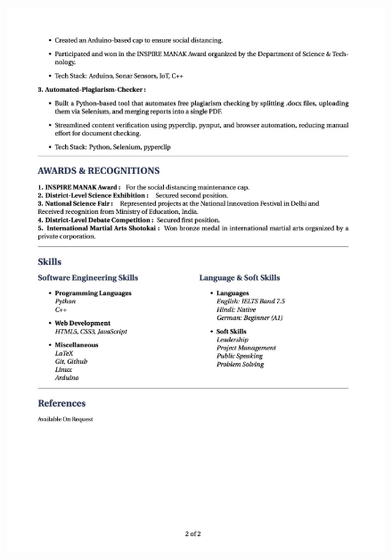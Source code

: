 \documentclass{report}
\begin{document}
\begin{figure}[h]
\begin{minipage}{0.49\textwidth}
        \includegraphics[width=1\linewidth]{CV/CV-pg2.jpeg}  
    \end{minipage}
\end{figure}

\newpage
\end{document}
